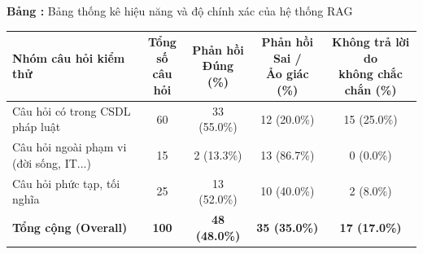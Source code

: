 \begin{table}[H]
\centering
{}
\textbf{Bảng \thetable:} Bảng thống kê hiệu năng và độ chính xác của hệ thống RAG
\label{tab:hieu_nang_do_chinh_xac}
\vspace{0.5em}
\begin{tabular}{|l|c|c|c|c|}
\hline
\textbf{Nhóm câu hỏi kiểm thử} & \makecell{\textbf{Tổng số}\\\textbf{câu hỏi}} & \makecell{\textbf{Phản hồi}\\\textbf{Đúng (\%)}} & \makecell{\textbf{Phản hồi Sai /}\\\textbf{Ảo giác (\%)}} & \makecell{\textbf{Không trả lời do}\\\textbf{không chắc chắn (\%)}} \\ \hline
Câu hỏi có trong CSDL pháp luật & 60 & 33 (55.0\%) & 12 (20.0\%) & 15 (25.0\%) \\ \hline
Câu hỏi ngoài phạm vi (đời sống, IT...) & 15 & 2 (13.3\%) & 13 (86.7\%) & 0 (0.0\%) \\ \hline
Câu hỏi phức tạp, tối nghĩa & 25 & 13 (52.0\%) & 10 (40.0\%) & 2 (8.0\%) \\ \hline
\textbf{Tổng cộng (Overall)} & \textbf{100} & \textbf{48 (48.0\%)} & \textbf{35 (35.0\%)} & \textbf{17 (17.0\%)} \\ \hline
\end{tabular}
\end{table}
